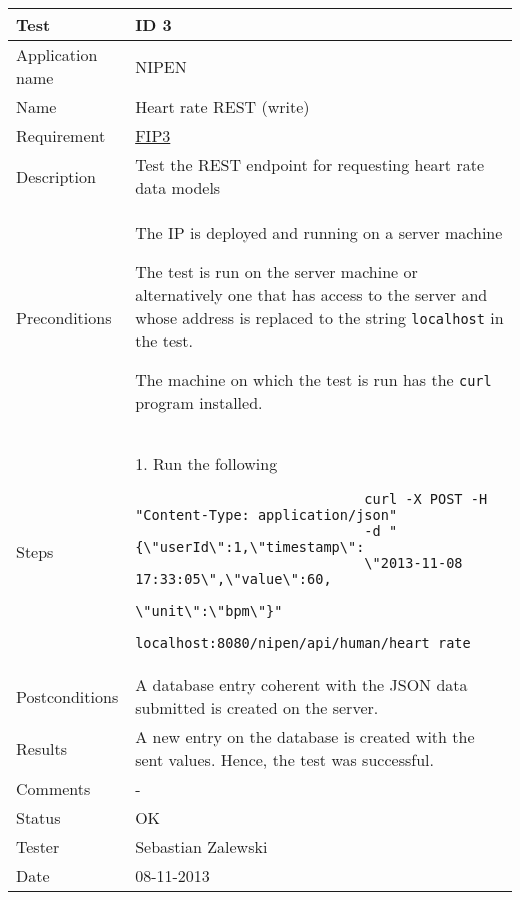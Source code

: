 \begin{table}
\begin{center}
\begin{tabular}{ | l | p{10cm} | }
	\hline
	\textbf{Test}	&	\textbf{ID 3} \\
	\hline\noalign{\smallskip}\noalign{\smallskip}\hline
	Application name	& NIPEN \\
	Name				& Heart rate REST (write) \\
	Requirement			& \hyperref[table:reqip]{FIP3} \\
	Description			& Test the REST endpoint for requesting heart rate data models \\
	Preconditions		&	\par The IP is deployed and running on a server machine
							\par The test is run on the server machine or alternatively
							one that has access to the server and whose address is replaced to the
							string \verb|localhost| in the test.
							\par The machine on which the test is run has the \verb|curl| program installed. \\
	Steps 				&	1. Run the following \begin{verbatim}
							curl -X POST -H "Content-Type: application/json" 
							-d "{\"userId\":1,\"timestamp\":
							\"2013-11-08 17:33:05\",\"value\":60,
							\"unit\":\"bpm\"}" 
							localhost:8080/nipen/api/human/heart_rate
							\end{verbatim} \\
	Postconditions		& A database entry coherent with the JSON data submitted is created on the server. \\
	Results				& A new entry on the database is created with the sent values.
						  Hence, the test was successful. \\
	Comments			& - \\
	Status				& OK \\
	Tester				& Sebastian Zalewski \\
	Date				& 08-11-2013 \\
	\hline
\end{tabular}
\end{center}
\end{table}


